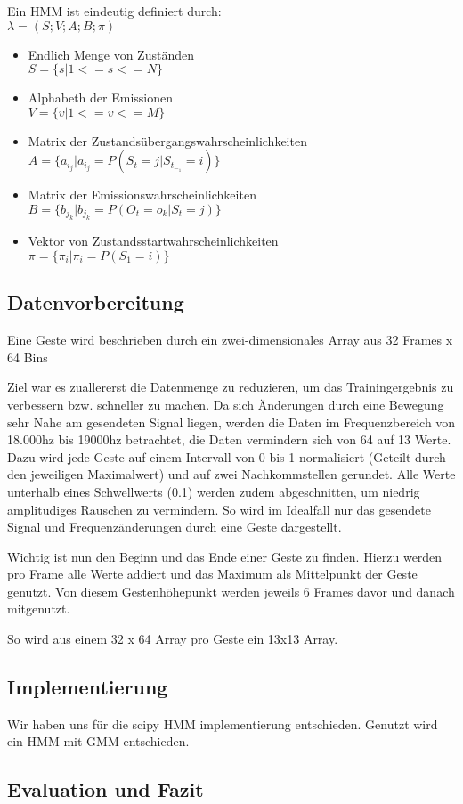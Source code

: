 Ein \acl{HMM} ist eindeutig definiert durch:\\ 
\( \lambda = (S;V;A;B;\pi)\)
\begin{itemize}
     \item Endlich Menge von Zuständen \\
           \( S = \{ s | 1 <= s <= N \} \)
     \item Alphabeth der Emissionen \\
           \( V = \{ v | 1 <= v <= M \} \)
     \item Matrix der Zustandsübergangswahrscheinlichkeiten \\
           \( A = \{ a_i_j | a_i_j = P(S_t = j | S_t_-_1 = i) \} \)
     \item Matrix der Emissionswahrscheinlichkeiten \\
           \( B = \{ b_j_k | b_j_k = P(O_t = o_k | S_t = j) \} \)
     \item Vektor von Zustandsstartwahrscheinlichkeiten \\
           \( \pi = \{ \pi_i | \pi_i = P(S_1 = i) \} \) 
   \end{itemize}
   

\subsection{Datenvorbereitung}
Eine Geste wird beschrieben durch ein zwei-dimensionales Array aus 32 Frames x 64 Bins

Ziel war es zuallererst die Datenmenge zu reduzieren, um das Trainingergebnis zu verbessern bzw. schneller zu machen.
Da sich Änderungen durch eine Bewegung sehr Nahe am gesendeten Signal liegen, werden die Daten im 
Frequenzbereich von 18.000hz bis 19000hz betrachtet, die Daten vermindern sich von 64 auf 13 Werte. 
Dazu wird jede Geste auf einem Intervall von 0 bis 1 normalisiert (Geteilt durch den jeweiligen Maximalwert) und 
auf zwei Nachkommstellen gerundet. 
Alle Werte unterhalb eines Schwellwerts (0.1) werden zudem abgeschnitten, um niedrig amplitudiges Rauschen zu vermindern. 
So wird im Idealfall nur das gesendete Signal und Frequenzänderungen durch eine Geste dargestellt.

Wichtig ist nun den Beginn und das Ende einer Geste zu finden. Hierzu werden pro Frame alle Werte addiert 
und das Maximum als Mittelpunkt der Geste genutzt. Von diesem Gestenhöhepunkt werden jeweils 6 Frames davor und danach mitgenutzt.

So wird aus einem 32 x 64 Array pro Geste ein 13x13 Array.


\subsection{Implementierung}
Wir haben uns für die scipy HMM implementierung entschieden. 
Genutzt wird ein \acl{HMM} mit \acl{GMM} entschieden.


\subsection{Evaluation und Fazit}
